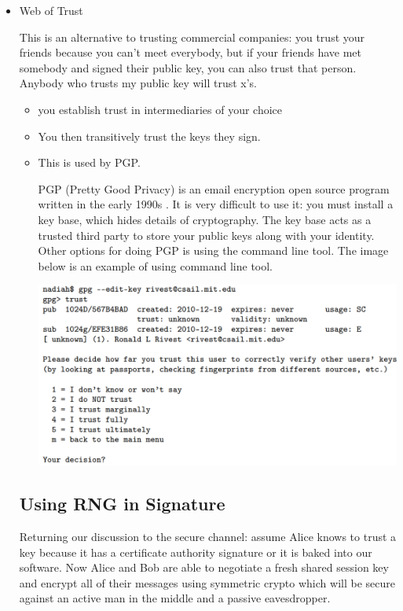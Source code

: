 \documentclass[11pt]{article} %
\begin{document}
\begin{itemize}
  \item  Web of Trust

  This is an alternative to trusting commercial companies: you trust your friends because you can't meet everybody, but if your friends have met somebody and signed their public key, you can also trust that person. Anybody who trusts my public key will trust x’s.
  \begin{itemize}
  \item you establish trust in intermediaries of your choice

  \item You then transitively trust the keys they sign.
  \item This is used by PGP.

  PGP (Pretty Good Privacy) is an email encryption open source program written in the early 1990s . It is very difficult to use it: you must install a key base, which hides details of cryptography. The key base acts as a trusted third party to store your public keys along with your identity. Other options for doing PGP is using the command line tool. The image below is an example of using command line tool.
\bigskip

\begin{center}
	\includegraphics[scale=0.55]{./Trust-in-keys2.png}
\end{center}
 
  \end{itemize}
  
  
\newpage
\subsection{Using RNG in Signature}

Returning our discussion to the secure channel: assume Alice knows to trust a key because it has a certificate authority signature or it is baked into our software. Now Alice and Bob are able to negotiate a fresh shared session key and encrypt all of their messages using symmetric crypto which will be secure against an active man in the middle and a passive eavesdropper.\\


\end{itemize}
\end{document}
